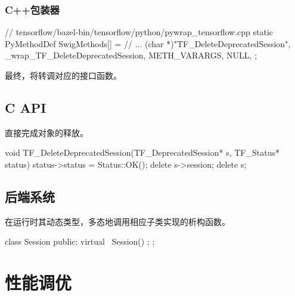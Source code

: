\begin{content}
\subsubsection{C++包装器}

\begin{leftbar}
\begin{c++}
// tensorflow/bazel-bin/tensorflow/python/pywrap\_tensorflow.cpp
static PyMethodDef SwigMethods[] = {
  // ...
  { (char *)"TF_DeleteDeprecatedSession", 
    _wrap_TF_DeleteDeprecatedSession, METH_VARARGS, NULL},
};
\end{c++}
\end{leftbar}

最终，将转调对应的接口函数。

\subsection{C API}

直接完成对象的释放。

\begin{leftbar}
\begin{c++}
void TF_DeleteDeprecatedSession(TF_DeprecatedSession* s, TF_Status* status) {
  status->status = Status::OK();
  delete s->session;
  delete s;
}
\end{c++}
\end{leftbar}

\subsection{后端系统}

在运行时其动态类型，多态地调用相应子类实现的析构函数。

\begin{leftbar}
\begin{c++}
class Session {
public:
  virtual ~Session() {};
};
\end{c++}
\end{leftbar}

\end{content}

\section{性能调优}

